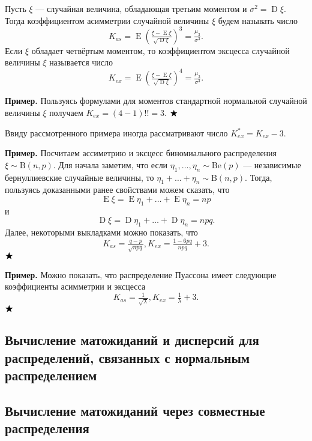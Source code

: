 \documentclass[12pt]{article}
\numberwithin{theorem}{section}
\theoremstyle{definition}
\newenvironment{example}{\indent \textbf{Пример.}}{$ \hfill \bigstar $}
\newcommand{\defin}[2]{\hypertarget{#2}{{\color{red} #1}}}
\newcommand{\expect}{\operatorname{E}}
\newcommand{\disp}{\operatorname{D}}
\begin{document}
	Пусть $ \xi $ --- случайная величина, обладающая третьим моментом и $ \sigma^2 = \disp\xi $.
	Тогда \defin{коэффициентом асимметрии случайной величины $ \xi $}{asimmetry} будем называть 
	число 
	$$ K_{as} = \expect\left(\tfrac{\xi - \expect\xi}{\sqrt{\disp\xi}}\right)^3 = \tfrac{\mu_3}{\sigma^3}. $$
	Если $ \xi $ обладает четвёртым моментом, то \defin{коэффициентом эксцесса случайной величины $ \xi $}{excess} 
	называется число
	$$ K_{ex} = \expect\left(\tfrac{\xi - \expect\xi}{\sqrt{\disp\xi}}\right)^4 = \tfrac{\mu_3}{\sigma^3}. $$
	
	\begin{example}
		Пользуясь формулами для моментов стандартной нормальной случайной величины $ \xi $
		получаем $ K_{ex} = (4 - 1)!! = 3 $.
	\end{example}
	
	Ввиду рассмотренного примера иногда рассматривают число $ K_{ex}^* = K_{ex} - 3 $.
	
	\begin{example}
		Посчитаем ассиметрию и эксцесс биномиального распределения $ \xi \sim \mathrm{B}(n, p) $.
		Для начала заметим, что если $ \eta_1, \ldots, \eta_n \sim \mathrm{Be}(p) $ --- 
		независимые бернуллиевские случайные величины, то $ \eta_1 + \ldots + \eta_n \sim \mathrm{B}(n, p) $.
		Тогда, пользуясь доказанными ранее свойствами можем сказать, что 
		$$ \expect\xi = \expect\eta_1 + \ldots + \expect\eta_n = np $$
		и 
		$$ \disp\xi = \disp\eta_1 + \ldots + \disp\eta_n = npq. $$
		Далее, некоторыми выкладками
		можно показать, что
		$$ K_{as} = \tfrac{q - p}{\sqrt{npq}}, K_{ex} = \tfrac{1 - 6pq}{npq} + 3. $$
	\end{example}
	
	\begin{example}
		Можно показать, что распределение Пуассона имеет следующие коэффициенты асимметрии и эксцесса
		$$ K_{as} = \tfrac{1}{\sqrt{\lambda}}, K_{ex} = \tfrac{1}{\lambda} + 3. $$
	\end{example}
		
	\subsection{Вычисление матожиданий и дисперсий для распределений, связанных с нормальным распределением}
	
	\subsection{Вычисление матожиданий через совместные распределения}
	
\end{document}
